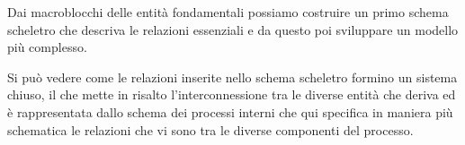 Dai macroblocchi delle entità fondamentali possiamo costruire un primo schema scheletro che descriva le relazioni essenziali e da questo poi sviluppare un modello più complesso.\newline



\noindent{}
\newline\newline
Si può vedere come le relazioni inserite nello schema scheletro formino un sistema chiuso, il che mette in risalto l'interconnessione tra le diverse entità che deriva ed è rappresentata dallo schema dei processi interni che qui specifica in maniera più schematica le relazioni che vi sono tra le diverse componenti del processo.
